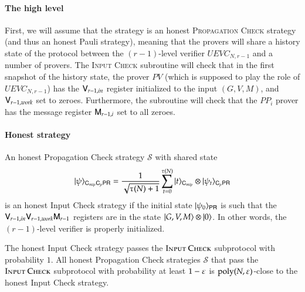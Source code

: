 \paragraph{The high level} First, we will assume that the strategy is an honest \textsc{Propagation Check} strategy (and thus an honest Pauli strategy), meaning that the provers will share a history state of the protocol between the $(r-1)$-level verifier $UEVC_{N,r-1}$ and a number of provers. The \textsc{Input Check} subroutine will check that in the first snapshot of the history state, the prover $PV$ (which is supposed to play the role of $UEVC_{N,r-1}$) has the ${\mathsf{V}}_{r-1,in}$ register initialized to the input $(G,V,M)$, and ${\mathsf{V}}_{r-1,work} $ set to zeroes. Furthermore, the subroutine will check that the $PP_i$ prover has the message register ${\mathsf{M}}_{r-1,i}$ set to all zeroes.

\paragraph{Honest strategy}
An honest Propagation Check strategy $\mathcal{S}$ with shared state
\[
	|\psi\rangle_{{\mathsf{C}}_{mip} {\mathsf{C}}_p {\mathsf{P}} {\mathsf{R}}} = \frac{1}{\sqrt{\tau(N) + 1}} \sum_{t = 0}^{\tau(N)} |t\rangle_{{\mathsf{C}}_{mip}} \otimes |\psi_t\rangle_{{\mathsf{C}}_p {\mathsf{P}} {\mathsf{R}}}
\]
is an honest Input Check strategy if the initial state $|\psi_0\rangle_{{\mathsf{P}} {\mathsf{R}}}$ is such that the ${\mathsf{V}}_{r-1,in}{\mathsf{V}}_{r-1,work} {\mathsf{M}}_{r-1}$ registers are in the state $|G,V,M\rangle \otimes |0\rangle$. In other words, the $(r-1)$-level verifier is properly initialized.




\begin{theorem}	
\label{thm:input_check}
The honest Input Check strategy passes the $\textsc{Input Check}$ subprotocol with probability $1$. All honest Propagation Check strategies $\mathcal{S}$ that pass the $\textsc{Input Check}$ subprotocol with probability at least $1 - \varepsilon$ is $\operatorname{poly}(N,\varepsilon)$-close to the honest Input Check strategy.
\end{theorem}

